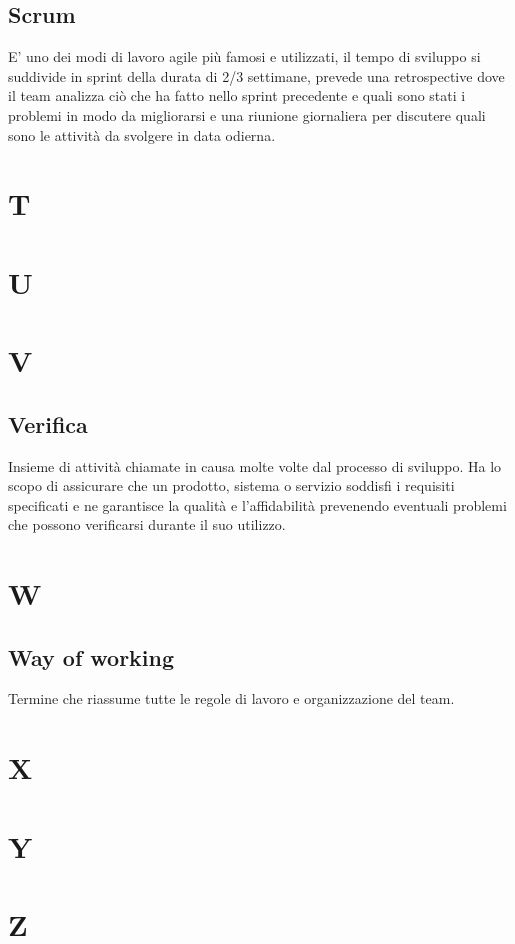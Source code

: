     \subsection{Scrum}
    E' uno dei modi di lavoro agile più famosi e utilizzati, il tempo di sviluppo si suddivide in sprint della durata di 2/3 settimane,
    prevede una retrospective dove il team analizza ciò che ha fatto nello sprint precedente e quali sono stati i problemi in modo da migliorarsi
    e una riunione giornaliera per discutere quali sono le attività da svolgere in data odierna.

\section{T}
\section{U}
\section{V}
    \subsection{Verifica}
    Insieme di attività chiamate in causa molte volte dal processo di sviluppo. Ha lo scopo di assicurare
    che un prodotto, sistema o servizio soddisfi i requisiti specificati e ne garantisce la qualità e l’affidabilità
    prevenendo eventuali problemi che possono verificarsi durante il suo utilizzo.

\section{W}
    \subsection{Way of working}
    Termine che riassume tutte le regole di lavoro e organizzazione del team.

\section{X}
\section{Y}
\section{Z}
